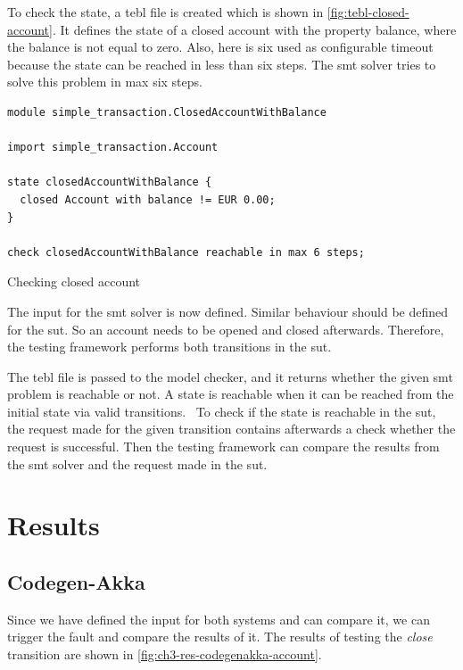 To check the state, a tebl file is created which is shown in
\autoref{fig:tebl-closed-account}. It defines the state of a closed account with
the property balance, where the balance is not equal to zero. Also, here is six
used as configurable timeout because the state can be reached in less than six
steps. The \gls{smt} solver tries to solve this problem in max six steps.

\begin{sourcecode}[h!]
\begin{lstlisting}[]
module simple_transaction.ClosedAccountWithBalance

import simple_transaction.Account

state closedAccountWithBalance {
  closed Account with balance != EUR 0.00;
}

check closedAccountWithBalance reachable in max 6 steps;
\end{lstlisting}
\caption{Checking closed account}\label{fig:tebl-closed-account}
\end{sourcecode}
\FloatBarrier

The input for the \gls{smt} solver is now defined. Similar behaviour should be defined
for the \gls{sut}. So an account needs to be opened and closed
afterwards. Therefore, the testing framework performs both transitions in the
\gls{sut}.

The tebl file is passed to the model checker, and it returns whether the given
\gls{smt} problem is reachable or not. A state is reachable when it can be reached
from the initial state via valid
transitions.~\cite[p.~4]{stoel_storm_vinju_bosman_2016} To check if the state is
reachable in the \gls{sut}, the request made for the given transition
contains afterwards a check whether the request is successful. Then the testing
framework can compare the results from the \gls{smt} solver and the request made in
the \gls{sut}.

\section{Results}

\subsection{Codegen-Akka}

Since we have defined the input for both systems and can compare it, we
can trigger the fault and compare the results of it. The results of testing the
\textit{close} transition are shown in \autoref{fig:ch3-res-codegenakka-account}.

